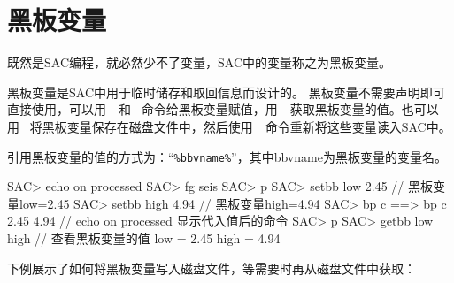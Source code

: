 \section{黑板变量}
既然是SAC编程，就必然少不了变量，SAC中的变量称之为黑板变量。

黑板变量是SAC中用于临时储存和取回信息而设计的。
黑板变量不需要声明即可直接使用，可以用~~和~
命令给黑板变量赋值，用~~获取黑板变量的值。也可以用~
将黑板变量保存在磁盘文件中，然后使用~~命令重新将这些变量读入SAC中。


引用黑板变量的值的方式为：``\verb+%bbvname%+''，其中bbvname为黑板变量的变量名。

\begin{SACCode}
SAC> echo on processed
SAC> fg seis
SAC> p
SAC> setbb low 2.45         // 黑板变量low=2.45
SAC> setbb high 4.94        // 黑板变量high=4.94
SAC> bp c %
 ==>  bp c 2.45 4.94        // echo on processed 显示代入值后的命令
SAC> p
SAC> getbb low high         // 查看黑板变量的值
 low = 2.45
 high = 4.94
\end{SACCode}

下例展示了如何将黑板变量写入磁盘文件，等需要时再从磁盘文件中获取：
